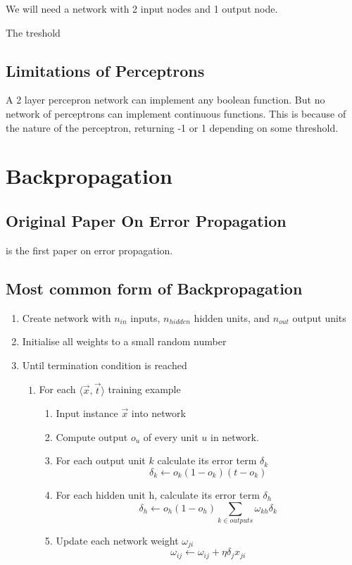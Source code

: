 \documentclass[10pt,a4paper]{article}
\begin{document}
We will need a network with 2 input nodes and 1 output node. 

The treshold 
\subsection{Limitations of Perceptrons}

A 2 layer percepron network can implement any boolean function. But no network of perceptrons can implement continuous functions. This is because of the nature of the perceptron, returning -1 or 1 depending on some threshold.

\citep{Michell2009}
\section{Backpropagation}
\subsection{Original Paper On Error Propagation}
\cite{rumel} is the first paper on error propagation.

\subsection{Most common form of Backpropagation}
\begin{enumerate}
\item Create network with $n_{in}$ inputs, $n_{hidden}$ hidden units, and $n_{out}$ output units
\item Initialise all weights to a small random number 
\item Until termination condition is reached
    \begin{enumerate}
    \item For each $\langle\vec{x},\vec{t}\rangle$ training example
         \begin{enumerate}
         \item Input instance $\vec{x}$ into network
         \item Compute output $o_u$ of every unit $u$ in network.
         \item For each output unit $k$ calculate its error term $\delta_k$
             \begin{equation}
             \delta_k \leftarrow o_k(1-o_k)(t-o_k)
             \end{equation}
         \item For each hidden unit h, calculate its error term $\delta_h$
             \begin{equation}
             \delta_h \leftarrow o_h(1-o_h)\sum_{k\in outputs} \omega_{kh}\delta_k
             \end{equation}
         \item Update each network weight $\omega_{ji}$
             \begin{equation}
             \omega_{ij} \leftarrow \omega_{ij} + \eta \delta_j x_{ji}
             \end{equation}                                          
         \end{enumerate}                 
    \end{enumerate}
\end{enumerate}
\end{document}
